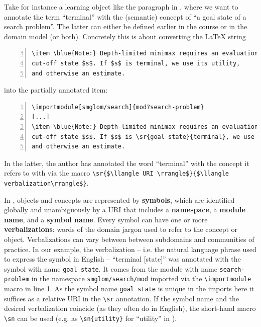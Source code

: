 \documentclass[runningheads]{llncs}
\def\llangle{\langle\kern-.2em\langle}
\def\rrangle{\rangle\kern-.2em\rangle}
\begin{document}
Take for instance a learning object like the paragraph in , where we want to
annotate the term ``terminal'' with the (semantic) concept of ``a goal state of a search
problem''. The latter can either be defined earlier in the course or in the domain model
(or both). Concretely this is about converting the {\LaTeX} string

\begin{lstlisting}[numbers=left,firstnumber=3,
caption=The unannotated {\LaTeX} sources of \Cref{fig:lo},label=lst:los]
\item \blue{Note:} Depth-limited minimax requires an evaluation for every
cut-off state $s$. If $s$ is terminal, we use its utility,
and otherwise an estimate.
\end{lstlisting}
into the partially annotated item:
\begin{lstlisting}[morekeywords={sr,importmodule},numbers=left,
caption=Annotating ``terminal'' in \Cref{lst:los},label=lst:losa]
\importmodule[smglom/search]{mod?search-problem}
[...]
\item \blue{Note:} Depth-limited minimax requires an evaluation for every
cut-off state $s$. If $s$ is \sr{goal state}{terminal}, we use its utility,
and otherwise an estimate.
\end{lstlisting}
In the latter, the author has annotated the word ``terminal'' with the concept it refers
to with via the \sTeX macro
\lstinline[mathescape]|\sr{$\llangle URI \rrangle$}{$\llangle verbalization\rrangle$}|.

In \sTeX, objects and concepts are represented by \textbf{symbols}, which are identified
globally and unambiguously by a URI that includes a \textbf{namespace}, a \textbf{module
  name}, and a \textbf{symbol name}. Every symbol can have one or more
\textbf{verbalizations}: words of the domain jargon used to refer to the concept or
object.  Verbalizations can vary between between subdomains and communities of
practice. In our example, the verbalization -- i.e. the natural language phrase used to
express the symbol in English -- ``terminal [state]'' was annotated with the symbol with
name \lstinline|goal state|. It comes from the module with name \lstinline|search-problem|
in the namespace \lstinline|smglom/search/mod| imported via the \lstinline|\importmodule|
macro in line 1. As the symbol name \lstinline|goal state| is unique in the imports here
it suffices as a relative URI in the \lstinline|\sr| annotation. If the symbol name and
the desired verbalization coincide (as they often do in English), the short-hand macro
\lstinline|\sn| can be used (e.g. as \lstinline|\sn{utility}| for ``utility'' in
).
\end{document}
